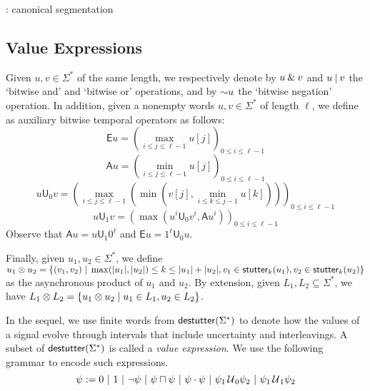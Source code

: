 \begin{example}
	\TODO: canonical segmentation
\end{example}

\subsection{Value Expressions}

Given $u,v \in \Sigma^*$ of the same length, we respectively denote by $u \mathbin{\&} v$ and $u \mathbin{|} v$ the `bitwise and' and `bitwise or' operations, and by $\mathord{\sim} u$ the `bitwise negation' operation.
In addition, given a nonempty words $u,v \in \Sigma^*$ of length $\ell$, we define as auxiliary bitwise temporal operators as follows:
$$ \mathsf{E} u = \left( \max_{i \leq j \leq \ell - 1} u[j] \right)_{0 \leq i \leq \ell - 1} $$
$$ \mathsf{A} u = \left( \min_{i \leq j \leq \ell - 1} u[j] \right)_{0 \leq i \leq \ell - 1} $$
$$ u \mathsf{U}_0 v = \left( \max_{i \leq j \leq \ell - 1} \left( \min \left( v[j], \min_{i \leq k \leq j - 1} u[k] \right) \right) \right)_{0 \leq i \leq \ell - 1} $$
$$ u \mathsf{U}_1 v = \left( \max \left( u^i \mathsf{U}_0 v^i, \mathsf{A} u^i \right) \right)_{0 \leq i \leq \ell - 1} $$
Observe that $\mathsf{A} u = u \mathsf{U}_1 0^\ell$ and $\mathsf{E} u = 1^\ell \mathsf{U}_0 u$.



Finally, given $u_1, u_2 \in \Sigma^*$, we define $u_1 \otimes u_2 = \{ (v_1,v_2) \st \max(|u_1|, |u_2|) \leq k \leq |u_1| + |u_2|, v_1 \in \stutter_k(u_1), v_2 \in \stutter_k(u_2) \}$ as the asynchronous product of $u_1$ and $u_2$.
By extension, given $L_1, L_2 \subseteq \Sigma^*$, we have $L_1 \otimes L_2 = \{ u_1 \otimes u_2 \st u_1 \in L_1, u_2 \in L_2 \}$.

In the sequel, we use finite words from $\mathsf{destutter}(\Sigma^*)$ to denote how the values of a signal evolve through intervals that include uncertainty and interleavings.
A subset of $\mathsf{destutter}(\Sigma^*)$ is called a \emph{value expression}.
We use the following grammar to encode such expressions. 
$$ \psi := 0 ~|~ 1 ~|~ \lnot \psi ~|~ \psi \sqcap \psi  ~|~ \psi \cdot \psi ~|~ \psi_1 \,\mathcal{U}\,_{\!0} \psi_2 ~|~ \psi_1 \,\mathcal{U}\,_{\!1} \psi_2 $$  %

